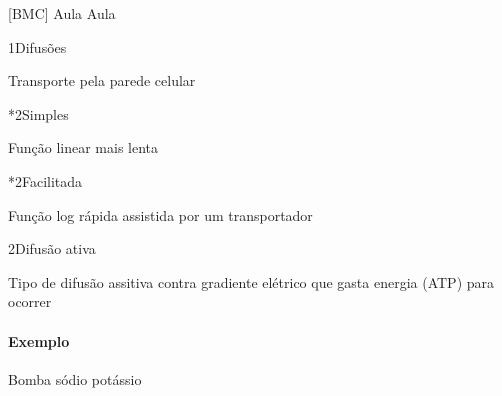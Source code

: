 \documentclass[\mainfilename]{subfiles}
\begin{document}
[BMC]
{Aula}
{Aula}

\begin{sectionBox}1{Difusões}
    
    Transporte pela parede celular

    \begin{multicols}{2}

       \begin{sectionBox}*2{Simples}
           
           Função linear mais lenta
           
       \end{sectionBox}

       \begin{sectionBox}*2{Facilitada}
           
           Função log rápida assistida por um transportador
           
       \end{sectionBox}

    \end{multicols}
    
\end{sectionBox}

\begin{sectionBox}2{Difusão ativa}
    
    Tipo de difusão assitiva contra gradiente elétrico que gasta energia (ATP) para ocorrer

    \paragraph*{Exemplo} Bomba sódio potássio
    
\end{sectionBox}
\end{document}
